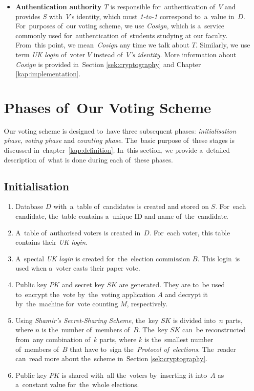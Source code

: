 \begin{itemize}
\item \textbf{Authentication authority $T$} is responsible for~authentication of~$V$ and provides $S$ with~$V$'s identity, which must \emph{1-to-1} correspond to~a~value in~$D$. For~purposes of~our voting scheme, we use \emph{Cosign}, which is a~service commonly used for~authentication of~students studying at our faculty. From~this point, we mean~\emph{Cosign} any time we talk about $T$. Similarly, we use term \emph{UK login} of~voter $V$ instead of~\emph{$V$'s identity}. More information about \emph{Cosign} is provided in~Section \ref{sek:cryptography}  and Chapter \ref{kap:implementation}.
\end{itemize}

\section{Phases of~Our Voting Scheme}
Our voting scheme is designed to~have three subsequent phases: \emph{initialisation phase}, \emph{voting phase} and \emph{counting phase}. The~basic purpose of~these stages is discussed in~chapter~\ref{kap:definition}. In~this section, we provide a~detailed description of~what is done during each of~these phases.

\subsection{Initialisation}
\begin{enumerate}
\item Database $D$ with~a~table of~candidates is created and stored on $S$. For~each candidate, the~table contains a~unique ID and name of~the~candidate.
\item A~table of~authorised voters is created in~$D$. For~each voter, this table contains their \emph{UK login}.
\item A~special \emph{UK login} is created for~the~election commission $B$. This login~is used when a~voter casts their paper vote.
\item Public key $PK$ and secret key $SK$ are generated. They are to~be used to~encrypt the~vote by~the~voting application $A$ and decrypt it by~the~machine for~vote counting $M$, respectively.
\item Using \emph{Shamir's Secret-Sharing Scheme}, the~key $SK$ is divided into~$n$ parts, where $n$ is the~number of~members of~$B$. The~key $SK$ can~be reconstructed from~any combination of~$k$ parts, where $k$ is the~smallest number of~members of~$B$ that have to~sign the~\emph{Protocol of~elections}. The~reader can~read more about the~scheme in~Section \ref{sek:cryptography}.
\item Public key $PK$ is shared with~all the~voters by~inserting it into~$A$ as a~constant value for~the~whole elections.
\end{enumerate}

